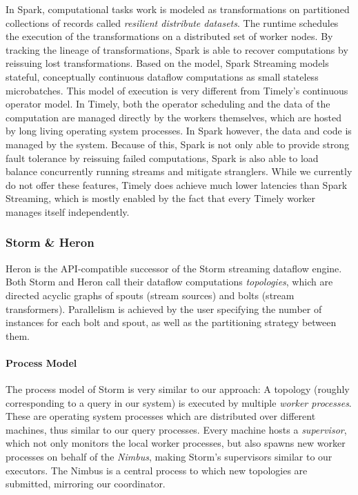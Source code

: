 In Spark, computational tasks work is modeled as transformations on partitioned
collections of records called \emph{resilient distribute datasets}. The
runtime schedules the execution of the transformations on a distributed set of
worker nodes. By tracking the lineage of transformations, Spark is able to
recover computations by reissuing lost transformations. Based on the model,
Spark Streaming models stateful, conceptually continuous dataflow computations
as small stateless microbatches. This model of execution is very different from
Timely's continuous operator model. In Timely, both the operator scheduling
and the data of the computation are managed directly by the workers themselves,
which are hosted by long living operating system processes. In Spark however,
the data and code is managed by the system. Because of this, Spark is not only
able to provide strong fault tolerance by reissuing failed computations, Spark
is also able to load balance concurrently running streams and mitigate stranglers.
While we currently do not offer these features, Timely does achieve much lower
latencies than Spark Streaming, which is mostly enabled by the fact that every
Timely worker manages itself independently.


\subsubsection{Storm \& Heron}

Heron \cite{heron} is the API-compatible successor of the Storm \cite{storm}
streaming dataflow engine.
Both Storm and Heron call their dataflow computations \emph{topologies}, which 
are directed acyclic graphs of spouts (stream sources) and bolts
(stream transformers). Parallelism is achieved by the user specifying the
number of instances for each bolt and spout, as well as the partitioning
strategy between them.

\paragraph{Process Model}

The process model of Storm is very similar to our approach: A topology
(roughly corresponding to a query in our system) is executed by multiple
\emph{worker processes}. These are operating system processes which are distributed
over different machines, thus similar to our query processes. Every machine hosts
a \emph{supervisor}, which not only monitors the local worker processes, but also spawns new worker
processes on behalf of the \emph{Nimbus}, making Storm's supervisors similar to our executors.
The Nimbus is a central process to which new topologies are submitted, mirroring our coordinator.

